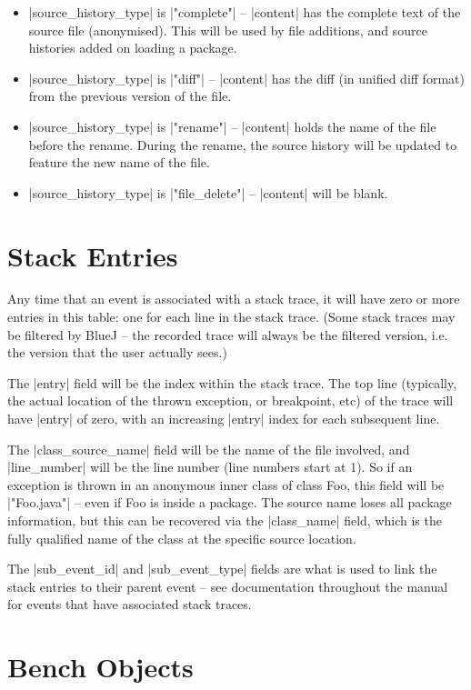 \documentclass{report}
\begin{document}
\begin{itemize}
\item |source_history_type| is |"complete"| -- |content| has the complete text
  of the source file (anonymised).  This will be
  used by file additions, and source histories added on loading a package.
\item |source_history_type| is |"diff"| -- |content| has the diff (in unified diff format) from
  the previous version of the file.
\item |source_history_type| is |"rename"| -- |content| holds the name of the file before the rename.  During the
  rename, the source history will be updated to feature the new name of the
  file.
\item |source_history_type| is |"file_delete"| -- |content| will be blank.
\end{itemize}

\section{Stack Entries}


Any time that an event is associated with a stack trace, it will have
zero or more entries in this table: one for each line in the stack
trace.  (Some stack traces may be filtered by BlueJ -- the recorded
trace will always be the filtered version, i.e. the version that the
user actually sees.)

The |entry| field will be the index within the stack trace.  The top
line (typically, the actual location of the thrown exception, or
breakpoint, etc) of the trace will have |entry| of zero, with an
increasing |entry| index for each subsequent line.

The |class_source_name| field will be the name of the file involved,
and |line_number| will be the line number (line numbers start at 1).
So if an exception is thrown in an anonymous inner class of class Foo,
this field will be |"Foo.java"| -- even if Foo is inside a package.
The source name loses all package information, but this can be
recovered via the |class_name| field, which is the fully qualified
name of the class at the specific source location.

The |sub_event_id| and |sub_event_type| fields are what is used to
link the stack entries to their parent event -- see documentation
throughout the manual for events that have associated stack traces.
\section{Bench Objects}
\end{document}
